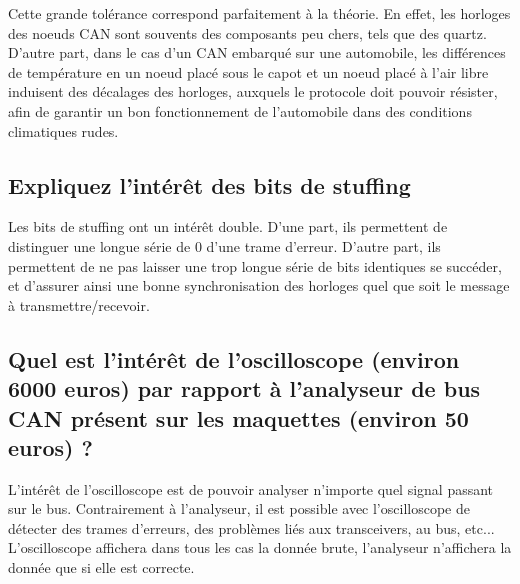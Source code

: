 \documentclass[12pt]{article}
\begin{document}
Cette grande tolérance correspond parfaitement à la théorie. En effet, les horloges des noeuds CAN sont souvents des composants peu chers, tels que des quartz. D'autre part, dans le cas d'un CAN embarqué sur une automobile, les différences de température en un noeud placé sous le capot et un noeud placé à l'air libre induisent des décalages des horloges, auxquels le protocole doit pouvoir résister, afin de garantir un bon fonctionnement de l'automobile dans des conditions climatiques rudes.

\subsection{Expliquez l'intérêt des bits de stuffing}

Les bits de stuffing ont un intérêt double. D'une part, ils permettent de distinguer une longue série de 0 d'une trame d'erreur. D'autre part, ils permettent de ne pas laisser une trop longue série de bits identiques se succéder, et d'assurer ainsi une bonne synchronisation des horloges quel que soit le message à transmettre/recevoir.

\subsection{Quel est l'intérêt de l'oscilloscope (environ 6000 euros) par rapport à l'analyseur de bus CAN présent sur les maquettes (environ 50 euros) ?}

L'intérêt de l'oscilloscope est de pouvoir analyser n'importe quel signal passant sur le bus. Contrairement à l'analyseur, il est possible avec l'oscilloscope de détecter des trames d'erreurs, des problèmes liés aux transceivers, au bus, etc... L'oscilloscope affichera dans tous les cas la donnée brute, l'analyseur n'affichera la donnée que si elle est correcte.
\end{document}
